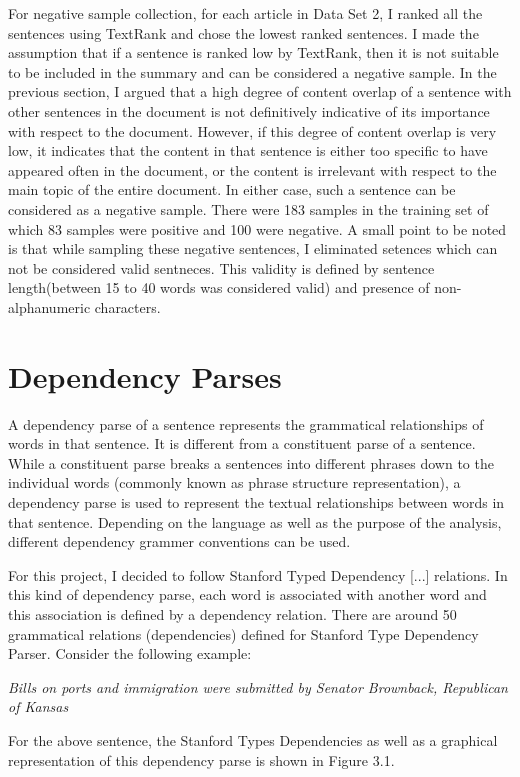 For negative sample collection, for each article in Data Set 2, I ranked all the sentences using TextRank and chose the lowest ranked sentences.
I made the assumption that if a sentence is ranked low by TextRank, then it is not suitable to be included in the summary and can be considered a negative sample.
In the previous section, I argued that a high degree of content overlap of a sentence with other sentences in the document is not definitively indicative of its importance with respect to the document.
However, if this degree of content overlap is very low, it indicates that the content in that sentence is either too specific to have appeared often in the document, or the content is irrelevant with respect to the main topic of the entire document.
In either case, such a sentence can be considered as a negative sample.
There were 183 samples in the training set of which 83 samples were positive and 100 were negative.
A small point to be noted is that while sampling these negative sentences, I eliminated setences which can not be considered valid sentneces. This validity is defined by sentence length(between 15 to 40 words was considered valid) and presence of non-alphanumeric characters.

\section{Dependency Parses}
A dependency parse of a sentence represents the grammatical relationships of words in that sentence.
It is different from a constituent parse of a sentence.
While a constituent parse breaks a sentences into different phrases down to the individual words (commonly known as phrase structure representation), a dependency parse is used to represent the textual relationships between words in that sentence.
Depending on the language as well as the purpose of the analysis, different dependency grammer conventions can be used.

For this project, I decided to follow Stanford Typed Dependency [...] relations.
In this kind of dependency parse, each word is associated with another word and this association is defined by a dependency relation.
There are around 50 grammatical relations (dependencies) defined for Stanford Type Dependency Parser.
Consider the following example:

\emph{Bills on ports and immigration were submitted by Senator Brownback, Republican of Kansas}

For the above sentence, the Stanford Types Dependencies as well as a graphical representation of this dependency parse is shown in Figure 3.1.

